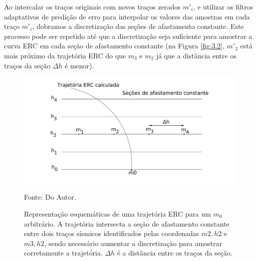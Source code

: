 Ao intercalar os traços originais com novos traços zerados $m'_i$, e utilizar os filtros adaptativos de predição
de erro para interpolar os valores das amostras em cada traço $m'_i$, dobramos 
a discretização das seções de afastamento constante.
Este processo pode ser repetido até que a discretização seja suficiente para amostrar a curva ERC em cada seção de afastamento
constante (na Figura \ref{fig:3.2}, $m'_2$ está mais próximo da trajetória 
ERC do que $m_3$ e $m_2$ já que a distância 
entre os traços da seção $\Delta h$ é menor).

\begin{figure}
\caption{Representação esquemáticas de uma trajetória ERC para um $m_0$ arbitrário. A trajetória intersecta a seção de
afastamento constante entre dois traços sísmicos identificados pelas coordenadas $m2, h2$ e $m3, h2$, sendo necessário
aumentar a discretização para amostrar corretamente a trajetória. $\Delta h$ é a distância entre os traços da seção.}
\begin{center}
\includegraphics[scale=0.15]{images/interpolacao0.png}
\vspace{-0.3cm}
\end{center}
\begin{center}
 Fonte: Do Autor.
\end{center}
\label{fig:3.1}
\end{figure}


